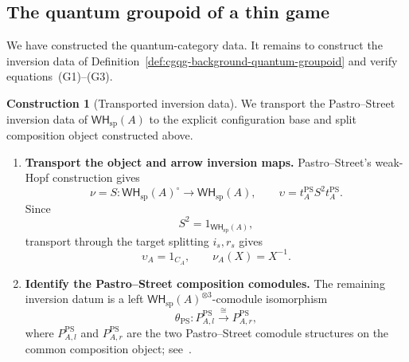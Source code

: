 \documentclass[oneside]{article}
\newcommand{\WH}{\mathsf{WH}}
\theoremstyle{plain}
\theoremstyle{definition}
\newtheorem{construction}[theorem]{Construction}
\theoremstyle{remark}
\begin{document}
\subsection{The quantum groupoid of a thin game}
\label{subsec:cgqg-game-quantum-groupoid}

We have constructed the quantum-category data. It remains to construct the inversion data of Definition~\ref{def:cgqg-background-quantum-groupoid} and verify equations~\textup{(G1)--(G3)}.

\begin{construction}[Transported inversion data]
\label{con:cgqg-transported-inversion-data}
    We transport the Pastro--Street inversion data of \(\WH_{\mathrm{sp}}(A)\) to the explicit configuration base and split composition object constructed above.

    \leavevmode
    \begin{enumerate}
        \item \textbf{Transport the object and arrow inversion maps.} Pastro--Street's weak-Hopf construction gives
        \[
            \nu
            =
            S:
            \WH_{\mathrm{sp}}(A)^\circ
            \longrightarrow
            \WH_{\mathrm{sp}}(A),
            \qquad
            \upsilon
            =
            t_A^{\mathrm{PS}}S^2t_A^{\mathrm{PS}}.
        \]
        Since
        \[
            S^2=1_{\WH_{\mathrm{sp}}(A)},
        \]
        transport through the target splitting \(i_s,r_s\) gives
        \begin{equation}
            \upsilon_A
            =
            1_{C_A},
            \qquad
            \nu_A(X)
            =
            X^{-1}.
            \label{eq:cgqg-vacant-inversion-simplification}
        \end{equation}

        \item \textbf{Identify the Pastro--Street composition comodules.} The remaining inversion datum is a left \(\WH_{\mathrm{sp}}(A)^{\otimes3}\)-comodule isomorphism
        \begin{equation}
            \theta_{\mathrm{PS}}:
            P_{A,l}^{\mathrm{PS}}
            \xrightarrow{\cong}
            P_{A,r}^{\mathrm{PS}},
            \label{eq:cgqg-ps-theta-typed}
        \end{equation}
        where \(P_{A,l}^{\mathrm{PS}}\) and \(P_{A,r}^{\mathrm{PS}}\) are the two Pastro--Street comodule structures on the common composition object; see~\cite[\S5.3, Thm.~6.1 and \S6.1]{PastroStreet2009}.


\end{enumerate}
\end{construction}
\end{document}
